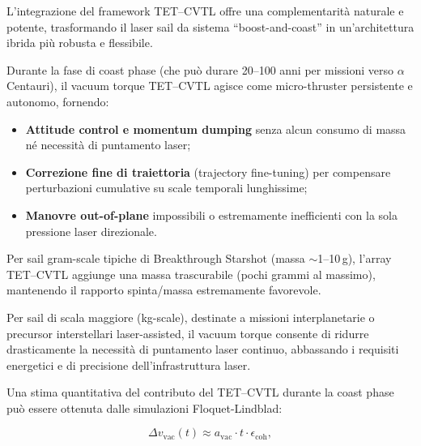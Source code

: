 \documentclass[11pt,a4paper]{article}
\theoremstyle{plain}
\theoremstyle{definition}
\begin{document}
L’integrazione del framework TET--CVTL offre una complementarità naturale e potente, trasformando il laser sail da sistema “boost-and-coast” in un’architettura ibrida più robusta e flessibile.

\vspace{0.5cm}

Durante la fase di coast phase (che può durare 20–100 anni per missioni verso $\alpha$ Centauri), il vacuum torque TET--CVTL agisce come micro-thruster persistente e autonomo, fornendo:

\vspace{0.2cm}
\begin{itemize}
    \item \textbf{Attitude control e momentum dumping} senza alcun consumo di massa né necessità di puntamento laser;

    \vspace{0.2cm}
    \item \textbf{Correzione fine di traiettoria} (trajectory fine-tuning) per compensare perturbazioni cumulative su scale temporali lunghissime;


    \vspace{0.2cm}
    \item \textbf{Manovre out-of-plane} impossibili o estremamente inefficienti con la sola pressione laser direzionale.
\end{itemize}


\vspace{0.4cm}

Per sail gram-scale tipiche di Breakthrough Starshot (massa $\sim$1--10\,g), l’array TET--CVTL aggiunge una massa trascurabile (pochi grammi al massimo), mantenendo il rapporto spinta/massa estremamente favorevole. 

\vspace{0.5cm}

Per sail di scala maggiore (kg-scale), destinate a missioni interplanetarie o precursor interstellari laser-assisted, il vacuum torque consente di ridurre drasticamente la necessità di puntamento laser continuo, abbassando i requisiti energetici e di precisione dell’infrastruttura laser.

\vspace{0.4cm}

Una stima quantitativa del contributo del TET--CVTL durante la coast phase può essere ottenuta dalle simulazioni Floquet-Lindblad:



\vspace{0.2cm}
\begin{equation}
\Delta v_{\text{vac}}(t) \approx a_{\text{vac}} \cdot t \cdot \epsilon_{\text{coh}},
\label{eq:dv_vac_laser}
\end{equation}
\end{document}
